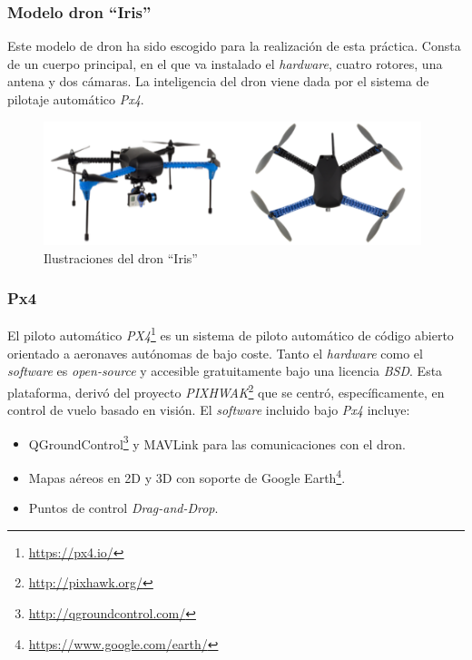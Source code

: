 \subsubsection{Modelo dron ``Iris''}
Este modelo de dron ha sido escogido para la realización de esta práctica. Consta de un cuerpo principal, en el que va instalado el \textit{hardware}, cuatro rotores, una antena y dos cámaras. La inteligencia del dron viene dada por el sistema de pilotaje automático \textit{Px4}.

\begin{figure}[H]
	\begin{center}
	    \includegraphics[width=0.98\textwidth]{figures/iris.png}
		\caption{Ilustraciones del dron ``Iris''}
		\label{fig.iris}
	\end{center}
\end{figure}

\subsubsection{Px4}
El piloto automático \textit{PX4}\footnote{\url{https://px4.io/}} es un sistema de piloto automático de código abierto orientado a aeronaves autónomas de bajo coste. Tanto el \textit{hardware} como el \textit{software} es \textit{open-source} y accesible gratuitamente bajo una licencia \textit{BSD}. Esta plataforma, derivó del proyecto \textit{PIXHWAK}\footnote{\url{http://pixhawk.org/}} que se centró, específicamente, en control de vuelo basado en visión. El \textit{software} incluido bajo \textit{Px4} incluye:
\begin{itemize}
    \item QGroundControl\footnote{\url{http://qgroundcontrol.com/}} y MAVLink para las comunicaciones con el dron.
    \item Mapas aéreos en 2D y 3D con soporte de Google Earth\footnote{\url{https://www.google.com/earth/}}.
    \item Puntos de control \textit{Drag-and-Drop}.
\end{itemize}

